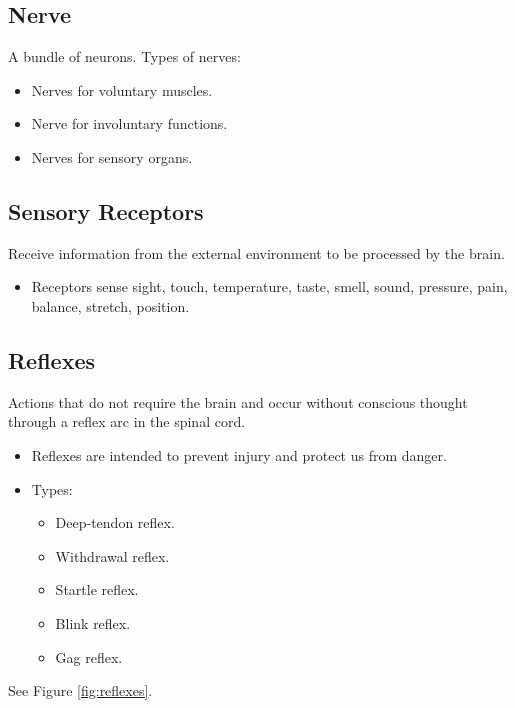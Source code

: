 \documentclass[12pt]{report}
\begin{document}
\subsection{Nerve}
\begin{definition}[Nerve]
    A bundle of neurons. Types of nerves: 
    \begin{itemize}
        \item{Nerves for voluntary muscles.}
        \item{Nerve for involuntary functions.}
        \item{Nerves for sensory organs.}
    \end{itemize}
\end{definition}

\subsection{Sensory Receptors}
\begin{definition}
    Receive information from the external environment to be processed by the brain. 
    \begin{itemize}
        \item{Receptors sense sight, touch, temperature, taste, smell, sound, pressure, pain, balance, stretch, position.}
    \end{itemize}
\end{definition}

\subsection{Reflexes}
\begin{definition}[Reflexes]
    Actions that do not require the brain and occur without conscious thought through a reflex arc in the spinal cord.
    \begin{itemize}
        \item{Reflexes are intended to prevent injury and protect us from danger.}
        \item{Types:}
            \begin{itemize}
                \item{Deep-tendon reflex.}
                \item{Withdrawal reflex.}
                \item{Startle reflex.}
                \item{Blink reflex.}
                \item{Gag reflex.}
            \end{itemize}
        \end{itemize}
        See Figure \ref{fig:reflexes}.
\end{definition}
\end{document}
